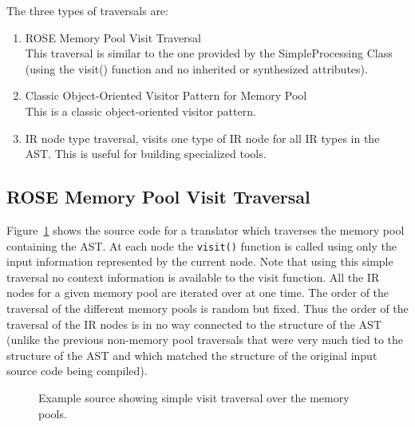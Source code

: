    The three types of traversals are:
\begin{enumerate}
   \item ROSE Memory Pool Visit Traversal \\
         This traversal is similar to the one provided by the SimpleProcessing Class 
    (using the visit() function and no inherited or synthesized attributes).
   \item Classic Object-Oriented Visitor Pattern for Memory Pool \\
         This is a classic object-oriented visitor pattern.
   \item IR node type traversal, visits one type of IR node for all IR types in the AST.
         This is useful for building specialized tools.
\end{enumerate}


\subsection{ROSE Memory Pool Visit Traversal}

Figure~\ref{Tutorial:exampleMemoryPoolVisitorTraversal} shows the source code 
for a translator which traverses the memory pool containing the AST.  At each 
node the {\tt visit()} function is called using only the input information
represented by the current node.  Note that using this simple traversal
no context information is available to the visit function. 
All the IR nodes for a given memory pool are iterated over at one time.
The order of the traversal of the different memory pools is random but fixed.
Thus the order of the traversal of the IR nodes is in no way connected to the
structure of the AST (unlike the previous non-memory pool traversals that were
very much tied to the structure of the AST and which matched the structure of the 
original input source code being compiled).

\begin{figure}[!h]
{\indent
{\mySmallFontSize

\begin{latexonly}
   
\end{latexonly}

\begin{htmlonly}
   
\end{htmlonly}

}
}
\caption{Example source showing simple visit traversal over the memory pools.}
\label{Tutorial:exampleMemoryPoolVisitorTraversal}
\end{figure}



